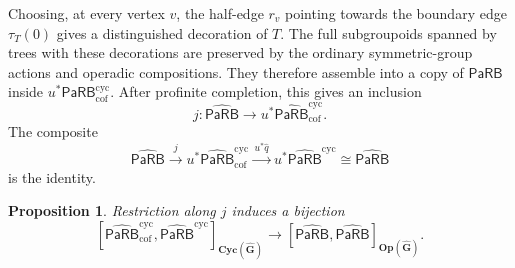 \documentclass{amsart}
\newcommand{\Grpd}{\mathbf{G}}
\newcommand{\PaRB}{\mathsf{PaRB}}
\newcommand{\Cyc}{\mathbf{Cyc}}
\newcommand{\Op}{\mathbf{Op}}
\newtheorem{prop}[theorem]{Proposition}%
\theoremstyle{definition}
\numberwithin{equation}{section}
\begin{document}
Choosing, at every vertex $v$, the half-edge $r_v$ pointing
towards the boundary edge $\tau_T(0)$ gives a distinguished
decoration of $T$. The full subgroupoids spanned by trees with
these decorations are preserved by the ordinary symmetric-group
actions and operadic compositions. They therefore assemble into
a copy of $\PaRB$ inside
$u^*\PaRB_{\mathrm{cof}}^{\mathrm{cyc}}$.
After profinite completion, this gives an inclusion
\[
j\colon
\widehat{\PaRB}
\longrightarrow
u^*\widehat{\PaRB}_{\mathrm{cof}}^{\mathrm{cyc}}.
\]
The composite
\[
\widehat{\PaRB}
\xrightarrow{\,j\,}
u^*\widehat{\PaRB}_{\mathrm{cof}}^{\mathrm{cyc}}
\xrightarrow{\,u^*\widehat q\,}
u^*\widehat{\PaRB}^{\mathrm{cyc}}
\cong
\widehat{\PaRB}
\]
is the identity.

\begin{prop}
\label{prop: rooted and cyclic homotopy classes PaRB}
Restriction along $j$ induces a bijection
\[
\left[
\widehat{\PaRB}_{\mathrm{cof}}^{\mathrm{cyc}},
\widehat{\PaRB}^{\mathrm{cyc}}
\right]_{\Cyc(\widehat{\Grpd})}
\longrightarrow
\left[
\widehat{\PaRB},
\widehat{\PaRB}
\right]_{\Op(\widehat{\Grpd})}.
\]
\end{prop}
\end{document}
